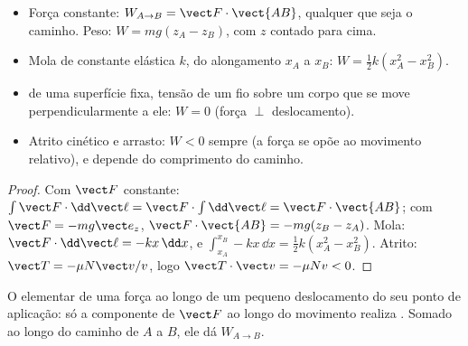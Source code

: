 \begin{proposition}\label{prop:b1:work-and-energy:works}
\begin{itemize}
  \item Força constante: $W_{A\to B} = \vect F\cdot\vect{AB}$, qualquer que seja o
        caminho. Peso: $W = mg(z_A - z_B)$, com $z$ contado para cima.
  \item Mola de constante elástica $k$, do alongamento $x_A$ a $x_B$:
        $W = \tfrac12 k(x_A^2 - x_B^2)$.
  \item {} de uma superfície fixa, tensão de um fio sobre um corpo
        que se move perpendicularmente a ele: $W = 0$ (força $\perp$ deslocamento).
  \item Atrito cinético e arrasto: $W < 0$ sempre (a força se opõe ao
        movimento relativo), e depende do comprimento do caminho.
\end{itemize}
\end{proposition}

\begin{proof}
Com $\vect F$ constante: $\int\vect F\cdot\dd\vect\ell = \vect F\cdot\int\dd\vect\ell
= \vect F\cdot\vect{AB}$; com $\vect F = -mg\vect e_z$, $\vect F\cdot\vect{AB}
= -mg(z_B - z_A)$. Mola: $\vect F\cdot\dd\vect\ell = -kx\,\dd x$, e
$\int_{x_A}^{x_B}-kx\,\dd x = \tfrac12 k(x_A^2 - x_B^2)$. Atrito: $\vect T
= -\mu N\vect v/v$, logo $\vect T\cdot\vect v = -\mu Nv < 0$.
\end{proof}

\begin{omfigure}

{\small O  elementar de uma força ao longo de um pequeno deslocamento do
seu ponto de aplicação: só a componente de $\vect F$ ao longo do
movimento realiza . Somado ao longo do caminho de $A$ a $B$, ele dá
$W_{A\to B}$.}
\end{omfigure}

